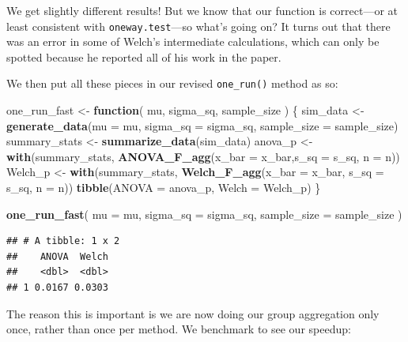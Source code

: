 \documentclass[
]{book}
\newenvironment{Shaded}{\begin{snugshade}}{\end{snugshade}}
\newcommand{\AttributeTok}[1]{\textcolor[rgb]{0.13,0.29,0.53}{#1}}
\newcommand{\ControlFlowTok}[1]{\textcolor[rgb]{0.13,0.29,0.53}{\textbf{#1}}}
\newcommand{\FunctionTok}[1]{\textcolor[rgb]{0.13,0.29,0.53}{\textbf{#1}}}
\newcommand{\NormalTok}[1]{#1}
\newcommand{\OtherTok}[1]{\textcolor[rgb]{0.56,0.35,0.01}{#1}}
\begin{document}
We get slightly different results! But we know that our function is correct---or at least consistent with \texttt{oneway.test}---so what's going on? It turns out that there was an error in some of Welch's intermediate calculations, which can only be spotted because he reported all of his work in the paper.

We then put all these pieces in our revised \texttt{one\_run()} method as so:

\begin{Shaded}
\begin{Highlighting}[]
\NormalTok{one\_run\_fast }\OtherTok{\textless{}{-}} \ControlFlowTok{function}\NormalTok{( mu, sigma\_sq, sample\_size ) \{}
\NormalTok{  sim\_data }\OtherTok{\textless{}{-}} \FunctionTok{generate\_data}\NormalTok{(}\AttributeTok{mu =}\NormalTok{ mu, }\AttributeTok{sigma\_sq =}\NormalTok{ sigma\_sq,}
                            \AttributeTok{sample\_size =}\NormalTok{ sample\_size)}
\NormalTok{  summary\_stats }\OtherTok{\textless{}{-}} \FunctionTok{summarize\_data}\NormalTok{(sim\_data)}
\NormalTok{  anova\_p }\OtherTok{\textless{}{-}} \FunctionTok{with}\NormalTok{(summary\_stats, }
                  \FunctionTok{ANOVA\_F\_agg}\NormalTok{(}\AttributeTok{x\_bar =}\NormalTok{ x\_bar,}\AttributeTok{s\_sq =}\NormalTok{ s\_sq, }\AttributeTok{n =}\NormalTok{ n))}
\NormalTok{  Welch\_p }\OtherTok{\textless{}{-}} \FunctionTok{with}\NormalTok{(summary\_stats, }
                  \FunctionTok{Welch\_F\_agg}\NormalTok{(}\AttributeTok{x\_bar =}\NormalTok{ x\_bar, }\AttributeTok{s\_sq =}\NormalTok{ s\_sq, }\AttributeTok{n =}\NormalTok{ n))}
  \FunctionTok{tibble}\NormalTok{(}\AttributeTok{ANOVA =}\NormalTok{ anova\_p, }\AttributeTok{Welch =}\NormalTok{ Welch\_p)}
\NormalTok{\}}

\FunctionTok{one\_run\_fast}\NormalTok{( }\AttributeTok{mu =}\NormalTok{ mu, }\AttributeTok{sigma\_sq =}\NormalTok{ sigma\_sq,}
              \AttributeTok{sample\_size =}\NormalTok{ sample\_size )}
\end{Highlighting}
\end{Shaded}

\begin{verbatim}
## # A tibble: 1 x 2
##    ANOVA  Welch
##    <dbl>  <dbl>
## 1 0.0167 0.0303
\end{verbatim}

The reason this is important is we are now doing our group aggregation only once, rather than once per method.
We benchmark to see our speedup:
\end{document}
